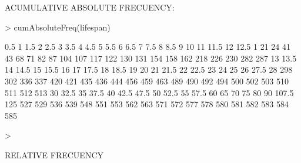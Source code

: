 \documentclass[a4paper]{article}
\begin{document}
ACUMULATIVE ABSOLUTE FRECUENCY:

\begin{Schunk}
\begin{Sinput}
> cumAbsoluteFreq(lifespan)
\end{Sinput}
\begin{Soutput}
  0.5     1   1.5     2   2.5     3   3.5     4   4.5     5   5.5     6   6.5     7   7.5     8   8.5     9    10    11  11.5    12  12.5 
    1    21    24    41    43    68    71    82    87   104   107   117   122   130   131   154   158   162   218   226   230   282   287 
   13  13.5    14  14.5    15  15.5    16    17  17.5    18  18.5    19    20    21  21.5    22  22.5    23    24    25    26  27.5    28 
  298   302   336   337   420   421   435   436   444   456   459   463   489   490   492   494   500   502   503   510   511   512   513 
   30  32.5    35  37.5    40  42.5  47.5    50  52.5    55  57.5    60    65    70    75    80    90 107.5   125 
  527   529   536   539   548   551   553   562   563   571   572   577   578   580   581   582   583   584   585 
\end{Soutput}
\begin{Sinput}
> 
\end{Sinput}
\end{Schunk}

RELATIVE FRECUENCY
\end{document}
